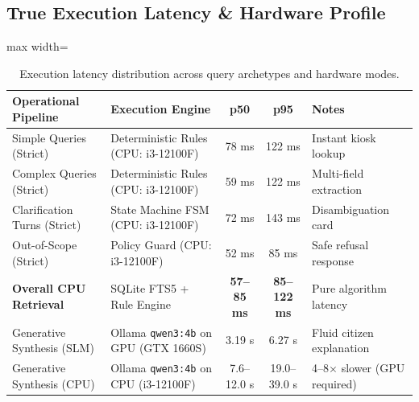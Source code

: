 \documentclass[11pt,a4paper]{article}
\begin{document}
\subsection{True Execution Latency \& Hardware Profile}
\begin{table}[htbp]
\centering
\caption{Execution latency distribution across query archetypes and hardware modes.}
\label{tab:latency}
\small
\begin{adjustbox}{max width=\textwidth}
\begin{tabular}{@{}p{4.0cm}p{4.6cm}ccp{3.0cm}@{}}
\toprule
\textbf{Operational Pipeline} & \textbf{Execution Engine} & \textbf{p50} & \textbf{p95} & \textbf{Notes}\\
\midrule
Simple Queries (Strict) & Deterministic Rules (CPU: i3-12100F) & 78 ms & 122 ms & Instant kiosk lookup\\
Complex Queries (Strict) & Deterministic Rules (CPU: i3-12100F) & 59 ms & 122 ms & Multi-field extraction\\
Clarification Turns (Strict) & State Machine FSM (CPU: i3-12100F) & 72 ms & 143 ms & Disambiguation card\\
Out-of-Scope (Strict) & Policy Guard (CPU: i3-12100F) & 52 ms & 85 ms & Safe refusal response\\
\textbf{Overall CPU Retrieval} & SQLite FTS5 + Rule Engine & \textbf{57--85 ms} & \textbf{85--122 ms} &
Pure algorithm latency\\
Generative Synthesis (SLM) & Ollama \texttt{qwen3:4b} on GPU (GTX 1660S) & 3.19 s & 6.27 s & Fluid
citizen explanation\\
Generative Synthesis (CPU) & Ollama \texttt{qwen3:4b} on CPU (i3-12100F) & 7.6--12.0 s & 19.0--39.0 s &
4--8$\times$ slower (GPU required)\\
\bottomrule
\end{tabular}
\end{adjustbox}
\end{table}
\end{document}
